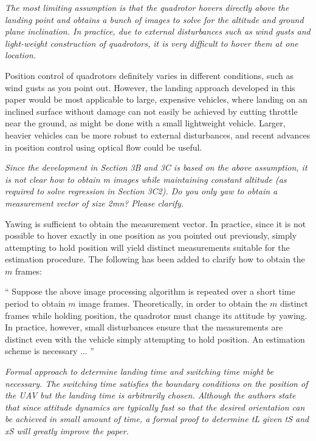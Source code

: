 \documentclass[11pt]{article}
\newenvironment{correction}{\begin{list}{}{\setlength{\leftmargin}{1cm}\setlength{\rightmargin}{1cm}}\vspace{\parsep}\item[]``}{''\end{list}}
\begin{document}
\begin{itemize}
\item
\textit{The most limiting assumption is that the quadrotor hovers directly above the landing point and obtains a bunch of images to solve for the altitude and ground plane inclination. 
In practice, due to external disturbances such as wind gusts and light-weight construction of quadrotors, it is very difficult to hover them at one location.
}

Position control of quadrotors definitely varies in different conditions, such as wind gusts as you point out. 
However, the landing approach developed in this paper would be most applicable to large, expensive vehicles, where landing on an inclined surface without damage can not easily be achieved by cutting throttle near the ground, as might be done with a small lightweight vehicle.
Larger, heavier vehicles can be more robust to external disturbances, and recent advances in position control using optical flow could be useful. %

\item
\textit{Since the development in Section 3B and 3C is based on the above assumption, it is not clear how to obtain m images while maintaining constant altitude (as required to solve regression in Section 3C2). Do you only yaw to obtain a measurement vector of size 2mn? Please clarify.
}

Yawing is sufficient to obtain the measurement vector. 
In practice, since it is not possible to hover exactly in one position as you pointed out previously, simply attempting to hold position will yield distinct measurements suitable for the estimation procedure.
The following has been added to clarify how to obtain the $m$ frames:

\begin{correction}
Suppose the above image processing algorithm is repeated over a short time period to obtain $m$ image frames. 
Theoretically, in order to obtain the $m$ distinct frames while holding position, the quadrotor must change its attitude by yawing.
In practice, however, small disturbances ensure that the measurements are distinct even with the vehicle simply
attempting to hold position.
An estimation scheme is necessary ...
\end{correction}

\item
\textit{Formal approach to determine landing time and switching time might be necessary. 
The switching time satisfies the boundary conditions on the position of the UAV but the landing time is arbitrarily chosen. 
Although the authors state that since attitude dynamics are typically fast so that the desired orientation can be achieved in small amount of time, a formal proof to determine tL given tS and xS will greatly improve the paper.
}


\end{itemize}
\end{document}
